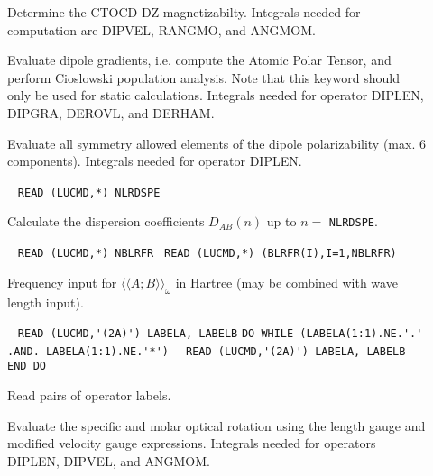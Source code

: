 \begin{description}
\item[]
Determine the CTOCD-DZ magnetizabilty. Integrals needed for 
computation are DIPVEL, RANGMO, and ANGMOM.

\item[]
Evaluate dipole gradients, i.e. compute the Atomic Polar Tensor, and
perform Cioslowski population analysis. Note that this keyword should
only be used for static calculations.
Integrals needed for operator DIPLEN, DIPGRA, DEROVL, and DERHAM.
 
\item[] 
Evaluate all symmetry allowed elements of the dipole polarizability
(max. 6 components).
Integrals needed for operator DIPLEN.

\item[] \verb| |\newline
   \verb|READ (LUCMD,*) NLRDSPE|

   Calculate the dispersion coefficients 
   $D_{AB}(n)$ up to $n = $ \verb+NLRDSPE+.

\item[] \verb| |\newline
   \verb|READ (LUCMD,*) NBLRFR |\newline
   \verb|READ (LUCMD,*) (BLRFR(I),I=1,NBLRFR)|

Frequency input for $\langle\langle A;B \rangle\rangle_{\omega}$ in
Hartree (may be combined with wave length input).

%
%
%
\item[] \verb| |\newline
   \verb|READ (LUCMD,'(2A)') LABELA, LABELB|\newline
   \verb|DO WHILE (LABELA(1:1).NE.'.' .AND. LABELA(1:1).NE.'*')|\newline
   \verb|  READ (LUCMD,'(2A)') LABELA, LABELB|\newline
   \verb|END DO|

Read pairs of operator labels. 

\item[] 
Evaluate the specific and molar optical rotation using the length gauge
and modified velocity gauge
expressions.
Integrals needed for operators DIPLEN, DIPVEL, and ANGMOM.


\end{description}
